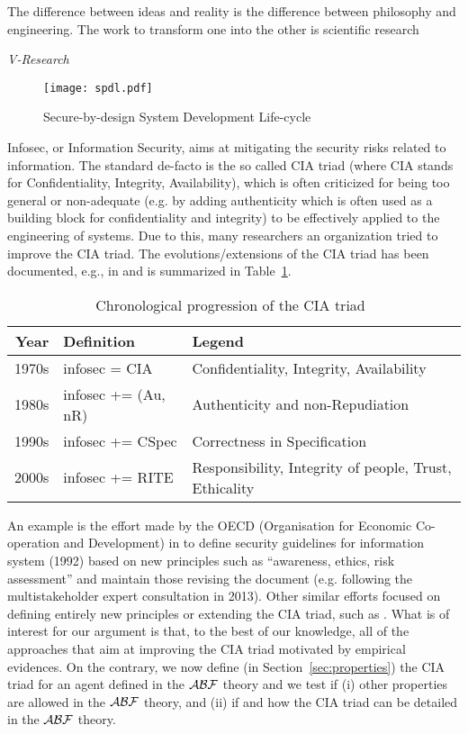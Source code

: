 \epigraph{The difference between ideas and reality is the
difference between philosophy and engineering. The work to transform one into
the other is scientific research}{{\itshape V-Research}}

\begin{figure}[t]
	\centering
	\texttt{[image: spdl.pdf]}
	\caption{Secure-by-design System Development Life-cycle}
	\label{fig:knowledge-belief}
\end{figure}

Infosec, or Information Security, aims at mitigating the security risks related
to information. The standard de-facto is the so called CIA triad 
(where CIA stands for Confidentiality, Integrity, Availability), which is often
criticized for being too general or non-adequate (e.g. by adding authenticity which is 
often used as a building block for confidentiality and integrity) 
to be effectively applied to the engineering of systems. Due to this,
many researchers an organization tried to improve the CIA triad. 
The evolutions/extensions of the CIA triad has been documented, e.g.,
in \autocite{Samonas2014cia} and is summarized in Table~\ref{tab:ciaevolution}.

\begin{table}[h]
\centering
\small
\begin{tabular}{rll} 
	{\bf Year} & {\bf Definition} & {\bf Legend}\\
	\hline
	1970s & infosec = CIA & Confidentiality, Integrity, Availability\\
	1980s & infosec += (Au, nR) & Authenticity and non-Repudiation\\
	1990s & infosec += CSpec & Correctness in Specification\\
	2000s & infosec += RITE & Responsibility, Integrity of people, Trust, Ethicality
\end{tabular}
\caption{Chronological progression of the CIA triad~\label{tab:ciaevolution}}
\end{table}


An example is the effort made by the OECD (Organisation for Economic
Co-operation and Development) in \autocite{OECD2013guidelines} to define
security guidelines for information system (1992) based on new principles such
as ``awareness, ethics, risk assessment'' and maintain those revising the
document (e.g.  following the multistakeholder expert consultation in 2013).
Other similar efforts focused on defining entirely new principles or extending
the CIA triad, such as \autocite{NISTSP800-160}. What is of interest for our
argument is that, to the best of our knowledge, all of the approaches that aim
at improving the CIA triad motivated by empirical evidences. On the contrary,
we now define (in Section~\ref{sec:properties}) the CIA triad for an agent
defined in the $\mathcal{A}\mathcal{B}\mathcal{F}$ theory and we test if (i) other properties are
allowed in the $\mathcal{A}\mathcal{B}\mathcal{F}$ theory, and (ii) if and how the CIA triad can be
detailed in the $\mathcal{A}\mathcal{B}\mathcal{F}$ theory.

